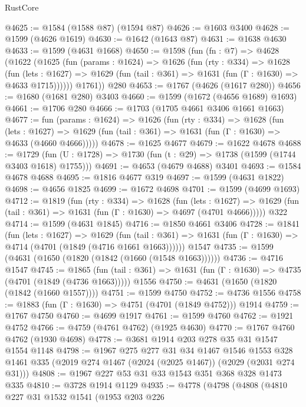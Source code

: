 \begin{lexlean}{RustCore}
\begin{coremodule}
@4625 := @1584 (@1588 @87) (@1594 @87)
@4626 := @1603 @3400
@4628 := @1599 (@4626 @1619)
@4630 := @1642 (@1643 @87)
@4631 := @1638 @4630
@4633 := @1599 (@4631 @1668)
@4650 := @1598
    (fun (fn : @7) =>
    @4628
      (@1622
        (@1625
          (fun (params : @1624) =>
          @1626
            (fun (rty : @334) =>
            @1628
              (fun (lets : @1627) =>
              @1629 (fun (tail : @361) => @1631 (fun (Γ : @1630) => @4633 @1715))))))
        @1761))
    @280
@4653 := @1767 (@4626 (@1617 @280))
@4656 := @1680 (@1681 @280) @3403
@4660 := @1599 (@1672 (@4656 @1689) @1693)
@4661 := @1706 @280
@4666 := @1703 (@1705 @4661 @3406 @1661 @1663)
@4677 := fun (params : @1624) =>
  @1626
    (fun (rty : @334) =>
    @1628
      (fun (lets : @1627) =>
      @1629 (fun (tail : @361) => @1631 (fun (Γ : @1630) => @4633 (@4660 @4666)))))
@4678 := @1625 @4677
@4679 := @1622 @4678
@4688 := @1729 (fun (U : @1728) => @1730 (fun (t : @29) => @1738 (@1599 (@1744 @3403 @1618) @1755)))
@4691 := @4653 (@4679 @4688) @3401
@4693 := @1584 @4678 @4688
@4695 := @1816 @4677 @319
@4697 := @1599 (@4631 @1822)
@4698 := @4656 @1825
@4699 := @1672 @4698
@4701 := @1599 (@4699 @1693)
@4712 := @1819
    (fun (rty : @334) =>
    @1628
      (fun (lets : @1627) =>
      @1629 (fun (tail : @361) => @1631 (fun (Γ : @1630) => @4697 (@4701 @4666)))))
    @322
@4714 := @1599 (@4631 @1845)
@4716 := @1850 @4661 @3406
@4728 := @1841
    (fun (lets : @1627) =>
    @1629
      (fun (tail : @361) => @1631 (fun (Γ : @1630) => @4714 (@4701 (@1849 (@4716 @1661 @1663))))))
    @1547
@4735 := @1599 (@4631 (@1650 (@1820 (@1842 (@1660 (@1548 @1663))))))
@4736 := @4716 @1547
@4745 := @1865
    (fun (tail : @361) => @1631 (fun (Γ : @1630) => @4735 (@4701 (@1849 (@4736 @1663)))))
    @1556
@4750 := @4631 (@1650 (@1820 (@1842 (@1660 @1557))))
@4751 := @1599 @4750
@4752 := @4736 @1556
@4758 := @1883 (fun (Γ : @1630) => @4751 (@4701 (@1849 @4752))) @1914
@4759 := @1767 @4750
@4760 := @4699 @1917
@4761 := @1599 @4760
@4762 := @1921 @4752
@4766 := @4759 (@4761 @4762) (@1925 @4630)
@4770 := @1767 @4760 @4762 (@1930 @4698)
@4778 := @3681 @1914 @203 @278 @35 @31 @1547 @1554 @1148
@4798 := @1967
    @275
    @277
    @31
    @34
    @1467
    @1546
    @1553
    @328
    @1461
    @335
    (@2019 @274 @1467 (@2024 (@2025 @1467)) (@2029 (@2031 @274 @31)))
@4808 := @1967 @227 @53 @31 @33 @1543 @351 @368 @328 @1473 @335
@4810 := @3728 @1914 @1129
@4935 := @4778
    (@4798
      (@4808
        (@4810
          @227
          @31
          @1532
          @1541
          (@1953
            @203
            @226

\end{coremodule}
\end{lexlean}

